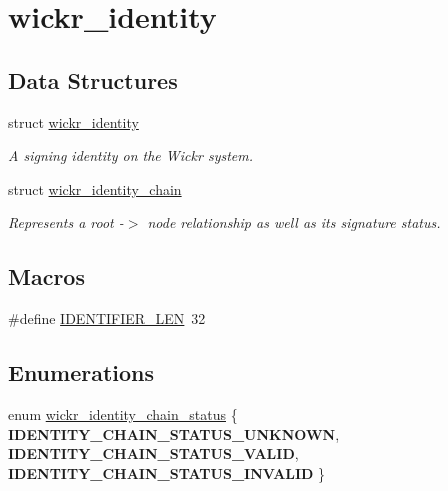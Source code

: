 \hypertarget{group__wickr__identity}{}\section{wickr\+\_\+identity}
\label{group__wickr__identity}
\subsection*{Data Structures}
\begin{DoxyCompactItemize}
\item 
struct \hyperlink{structwickr__identity}{wickr\+\_\+identity}
\begin{DoxyCompactList}\small\item\em A signing identity on the Wickr system. \end{DoxyCompactList}\item 
struct \hyperlink{structwickr__identity__chain}{wickr\+\_\+identity\+\_\+chain}
\begin{DoxyCompactList}\small\item\em Represents a root -\/$>$ node relationship as well as it\textquotesingle{}s signature status. \end{DoxyCompactList}\end{DoxyCompactItemize}
\subsection*{Macros}
\begin{DoxyCompactItemize}
\item 
\#define \hyperlink{group__wickr__identity_ga43bd60836203349a1c745d0d29bf7706}{I\+D\+E\+N\+T\+I\+F\+I\+E\+R\+\_\+\+L\+EN}~32
\end{DoxyCompactItemize}
\subsection*{Enumerations}
\begin{DoxyCompactItemize}
\item 
enum \hyperlink{group__wickr__identity_ga78aefa3835eb13ca75c0129583b5ebfa}{wickr\+\_\+identity\+\_\+chain\+\_\+status} \{ {\bfseries I\+D\+E\+N\+T\+I\+T\+Y\+\_\+\+C\+H\+A\+I\+N\+\_\+\+S\+T\+A\+T\+U\+S\+\_\+\+U\+N\+K\+N\+O\+WN}, 
{\bfseries I\+D\+E\+N\+T\+I\+T\+Y\+\_\+\+C\+H\+A\+I\+N\+\_\+\+S\+T\+A\+T\+U\+S\+\_\+\+V\+A\+L\+ID}, 
{\bfseries I\+D\+E\+N\+T\+I\+T\+Y\+\_\+\+C\+H\+A\+I\+N\+\_\+\+S\+T\+A\+T\+U\+S\+\_\+\+I\+N\+V\+A\+L\+ID}
 \}
\end{DoxyCompactItemize}
